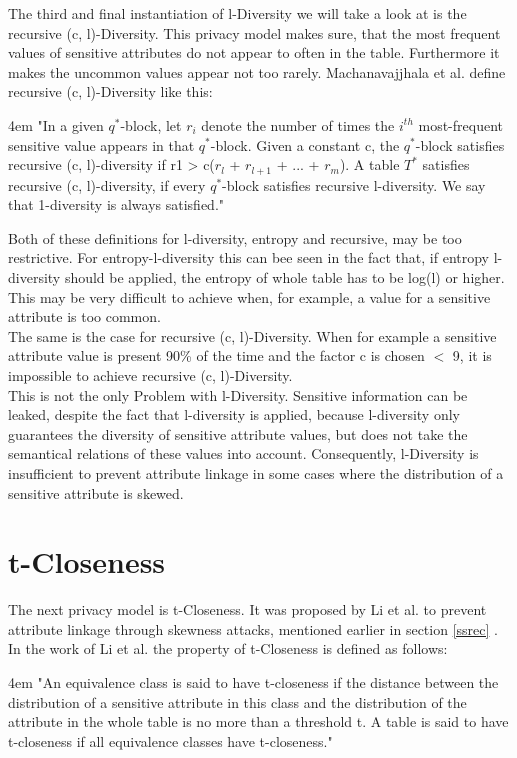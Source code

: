 \documentclass[12pt, a4paper,oneside]{report}
\begin{document}
The third and final instantiation of l-Diversity we will take a look at is the recursive (c, l)-Diversity. This privacy model makes sure, that the most frequent values of sensitive attributes do not appear to often in the table. Furthermore it makes the uncommon values appear not too rarely\cite{Fung2010}. Machanavajjhala et al. define recursive (c, l)-Diversity like this: \\
\par
\begingroup
\leftskip4em
\rightskip\leftskip
"In a given $q^*$-block, let $r_i$ denote
the number of times the $i^{th}$ most-frequent sensitive value appears in that $q^*$-block. Given a constant c, the $q^*$-block satisfies recursive (c, l)-diversity if r1 > c($r_l$ + $r_{l+1}$ + ... + $r_m$). A table $T^*$ satisfies recursive (c, l)-diversity, if every $q^*$-block satisfies recursive l-diversity. We say that 1-diversity is always satisfied."\cite{Machanavajjhala2006}\\
\par
\endgroup

Both of these definitions for l-diversity, entropy and recursive, may be too restrictive. For entropy-l-diversity this can bee seen in the fact that, if entropy l-diversity should be applied, the entropy of whole table has to be log(l) or higher. This may be very difficult to achieve when, for example, a value for a sensitive attribute is too common.\\
The same is the case for recursive (c, l)-Diversity. When for example a sensitive attribute value is present 90\% of the time and the factor c is chosen $<$ 9, it is impossible to achieve recursive (c, l)-Diversity\cite{Machanavajjhala2006}.\\
This is not the only Problem with l-Diversity. Sensitive information can be leaked, despite the fact that l-diversity is applied, because l-diversity only  guarantees the diversity of sensitive attribute values, but does not take the semantical relations of these values into account. Consequently, l-Diversity is insufficient to prevent attribute linkage in some cases where the distribution of a sensitive attribute is skewed\cite{Li2007}.    

\section{t-Closeness}

The next privacy model is t-Closeness. It was proposed by Li et al. to prevent attribute linkage through skewness attacks, mentioned earlier in section \ref{ssrec} \cite{Li2007}. In the work of Li et al. the property of t-Closeness is defined as follows: \\
\par
\begingroup
\leftskip4em
\rightskip\leftskip
"An equivalence class is said to have t-closeness if the distance between the
distribution of a sensitive attribute in this class and the distribution of the attribute in the whole table is no more than a threshold t. A table is said to have t-closeness if all equivalence classes have t-closeness."\cite{Li2007}\\
\par
\endgroup
\end{document}
